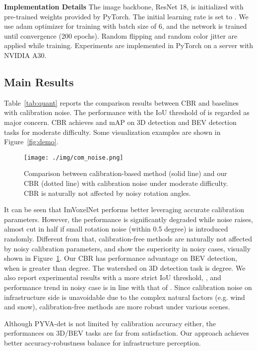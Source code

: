 \documentclass[letterpaper, 10 pt, conference]{ieeeconf}
\begin{document}
\textbf{Implementation Details}
The image backbone, ResNet 18, is initialized with pre-trained weights provided by PyTorch. The initial learning rate is set to . We use adam optimizer for training with batch size of 6, and the network is trained until convergence (200 epochs). Random flipping and random color jitter are applied while training. Experiments are implemented in PyTorch on a server with NVIDIA A30.

\subsection{Main Results}

Table~\ref{tab:quant} reports the comparison results between CBR and baselines with calibration noise. The performance with the IoU threshold of  is regarded as major concern. CBR achieves  and  mAP on 3D detection and BEV detection tasks for moderate difficulty. Some visualization examples are shown in Figure~\ref{fig:demo}. 

\begin{figure}[ht]
  \centering
  \texttt{[image: ./img/com\_noise.png]}
  \caption{Comparison between calibration-based method \cite{imvoxelnet} (solid line) and our CBR (dotted line) with calibration noise under moderate difficulty. CBR is naturally not affected by noisy rotation angles.}
  \label{fig:com}
\end{figure}

It can be seen that ImVoxelNet \cite{imvoxelnet} performs better leveraging accurate calibration parameters. However, the performance is significantly degraded while noise raises, almost cut in half if small rotation noise (within 0.5 degree) is introduced randomly. Different from that, calibration-free methods are naturally not affected by noisy calibration parameters, and show the superiority in noisy cases, visually shown in Figure~\ref{fig:com}. Our CBR has performance advantage on BEV detection, when  is greater than  degree. The watershed on 3D detection task is  degree. We also report experimental results with a more strict IoU threshold, , and performance trend in noisy case is in line with that of . Since calibration noise on infrastructure side is unavoidable due to the complex natural factors (e.g. wind and snow), calibration-free methods are more robust under various scenes. 

Although PYVA-det is not limited by calibration accuracy either, the performances on 3D/BEV tasks are far from satisfaction. Our approach achieves better accuracy-robustness balance for infrastructure perception.
\end{document}
